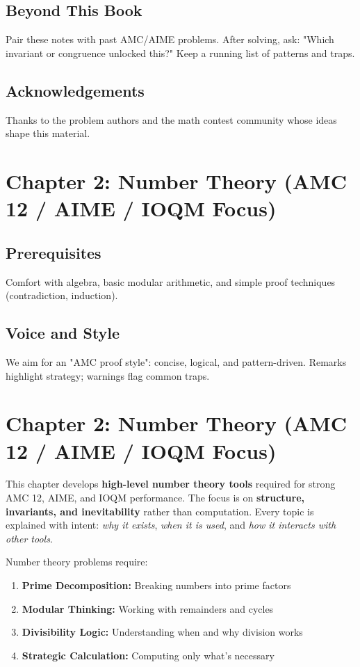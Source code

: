 \documentclass[12pt]{extarticle}
\begin{document}
\subsection*{Beyond This Book}
Pair these notes with past AMC/AIME problems. After solving, ask: "Which invariant or congruence unlocked this?" Keep a running list of patterns and traps.

\subsection*{Acknowledgements}
Thanks to the problem authors and the math contest community whose ideas shape this material.

\newpage

\section*{Chapter 2: Number Theory (AMC 12 / AIME / IOQM Focus)}

\subsection*{Prerequisites}
Comfort with algebra, basic modular arithmetic, and simple proof techniques (contradiction, induction).

\subsection*{Voice and Style}
We aim for an "AMC proof style": concise, logical, and pattern-driven. Remarks highlight strategy; warnings flag common traps.

\newpage

\section*{Chapter 2: Number Theory (AMC 12 / AIME / IOQM Focus)}

This chapter develops \textbf{high-level number theory tools} required for strong AMC 12, AIME, and IOQM performance. The focus is on \textbf{structure, invariants, and inevitability} rather than computation. Every topic is explained with intent: \emph{why it exists}, \emph{when it is used}, and \emph{how it interacts with other tools}.

\begin{conceptbox}
Number theory problems require:
\begin{enumerate}
    \item \textbf{Prime Decomposition:} Breaking numbers into prime factors
    \item \textbf{Modular Thinking:} Working with remainders and cycles
    \item \textbf{Divisibility Logic:} Understanding when and why division works
    \item \textbf{Strategic Calculation:} Computing only what's necessary
\end{enumerate}
\end{conceptbox}
\end{document}
